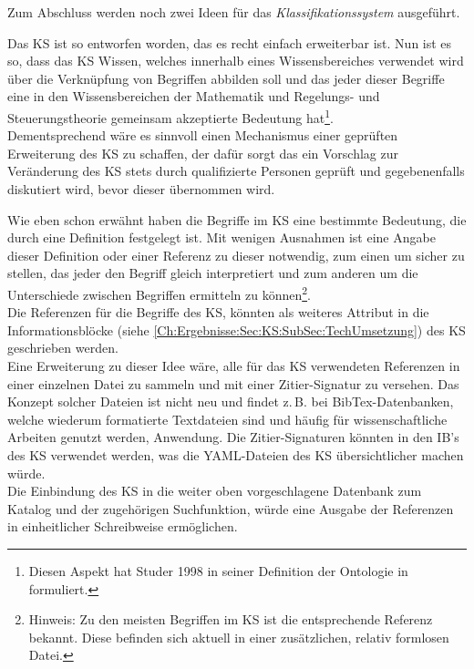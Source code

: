 Zum Abschluss werden noch zwei Ideen für das \textit{Klassifikationssystem} ausgeführt.

Das KS ist so entworfen worden, das es recht einfach erweiterbar ist. Nun ist es so, dass das KS Wissen, welches innerhalb eines Wissensbereiches verwendet wird über die Verknüpfung von Begriffen abbilden soll und das jeder dieser Begriffe eine in den Wissensbereichen der Mathematik und Regelungs- und Steuerungstheorie gemeinsam akzeptierte Bedeutung hat\footnote{Diesen Aspekt hat Studer 1998 in seiner Definition der Ontologie in \cite[Abschnitt 6.1]{STBEFE98} formuliert.}.\\
Dementsprechend wäre es sinnvoll einen Mechanismus einer geprüften Erweiterung des KS zu schaffen, der dafür sorgt das ein Vorschlag zur Veränderung des KS stets durch qualifizierte Personen geprüft und gegebenenfalls diskutiert wird, bevor dieser übernommen wird.

Wie eben schon erwähnt haben die Begriffe im KS eine bestimmte Bedeutung, die durch eine Definition festgelegt ist. Mit wenigen Ausnahmen ist eine Angabe dieser Definition oder einer Referenz zu dieser notwendig, zum einen um sicher zu stellen, das jeder den Begriff gleich interpretiert und zum anderen um die Unterschiede zwischen Begriffen ermitteln zu können\footnote{Hinweis: Zu den meisten Begriffen im KS ist die entsprechende Referenz bekannt. Diese befinden sich aktuell in einer zusätzlichen, relativ formlosen Datei.}.\\
Die Referenzen für die Begriffe des KS, könnten als weiteres Attribut in die Informationsblöcke (siehe \autoref{Ch:Ergebnisse:Sec:KS:SubSec:TechUmsetzung}) des KS geschrieben werden.\\
Eine Erweiterung zu dieser Idee wäre, alle für das KS verwendeten Referenzen in einer einzelnen Datei zu sammeln und mit einer Zitier-Signatur zu versehen. Das Konzept solcher Dateien ist nicht neu und findet z.\,B. bei BibTex-Datenbanken, welche wiederum formatierte Textdateien sind und häufig für wissenschaftliche Arbeiten genutzt werden, Anwendung. Die Zitier-Signaturen könnten in den IB's des KS verwendet werden, was die YAML-Dateien des KS übersichtlicher machen würde. \\
Die Einbindung des KS in die weiter oben vorgeschlagene Datenbank zum Katalog und der zugehörigen Suchfunktion, würde eine Ausgabe der Referenzen in einheitlicher Schreibweise ermöglichen.


